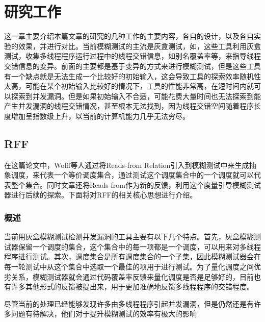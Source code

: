 
\section{研究工作}

这一章主要介绍本篇文章的研究的几种工作的主要内容，各自的设计，以及各自实验的效果，并进行对比。当前模糊测试的主流是灰盒测试，如\cite{jeong2019razzer, chen2020muzz, xu2020krace, jiang2022context}，这些工具利用灰盒测试，收集多线程程序运行过程中的线程交错信息，如别名覆盖率\cite{xu2020krace}等，来指导线程交错信息的变异。前面的主要都是基于变异的方式来进行模糊测试，但是这些工具有一个缺点就是无法生成一个比较好的初始输入，这会导致工具的探索效率随机性太高，可能在某个初始输入比较好的情况下，工具的性能非常高，在短时间内就可以探索到并发漏洞。但是如果初始输入不合适，可能花费大量时间也无法探索到能产生并发漏洞的线程交错情况，甚至根本无法找到，因为线程交错空间随着程序长度增加呈指数级上升，以当前的计算机能力几乎无法穷尽。

\subsection{RFF}

在\cite{wolff2024greybox}这篇论文中，Wolff等人通过将Reads-from Relation引入到模糊测试中来生成抽象调度，来代表一个等价调度集合，通过测试这个调度集合中的一个调度就可以代表整个集合。同时文章还将Reads-from作为新的反馈，利用这个度量引导模糊测试器进行后续的探索。下面将对RFF的相关核心思想进行介绍。

\subsubsection{概述}

当前用灰盒模糊测试检测并发漏洞的工具主要有以下几个特点。首先，灰盒模糊测试器保留一个调度的集合，这个集合中的每一项都是一个调度，可以用来对多线程程序进行测试。其次，调度集合是所有调度集合的一个子集，因此模糊测试器会在每一轮测试中从这个集合中选取一个最佳的项用于进行测试。为了量化调度之间优劣关系，模糊测试器就会通过代码覆盖率反馈来量化调度是否是足够好的，目前也有许多其他形式的反馈被提出来，用于更加准确地反馈多线程程序的交错程度。

尽管当前的处理已经能够发现许多由多线程程序引起并发漏洞，但是仍然还是有许多问题有待解决，他们对于提升模糊测试的效率有极大的影响